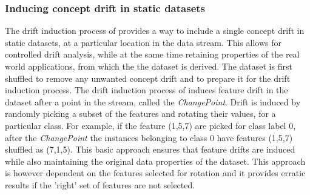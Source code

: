 \documentclass[authoryear,3p,times,twocolumn]{elsarticle}
\begin{document}
\begin{table}[t]
\centering
\caption{Characteristics of datasets chosen for drift induction experiments. }
\label{tbl:induced_data}
\end{table}


\subsubsection{Inducing concept drift in static datasets}
\label{sec:induction}

The drift induction process of \citep{zliobaite2010change} provides a way to include a single concept drift in static datasets, at a particular location in the data stream. This allows for controlled drift analysis, while at the same time retaining properties of the real world applications, from which the the dataset is derived. The dataset is first shuffled to remove any unwanted concept drift and to  prepare it for the drift induction process. The drift induction process of \citep{zliobaite2010change} induces feature drift in the dataset after a point in the stream, called the \textit{ChangePoint}. Drift is induced by randomly picking a subset of the features and rotating their values, for a particular class. For example, if the feature (1,5,7) are picked for class label 0, after the \textit{ChangePoint} the instances belonging to class 0 have features (1,5,7) shuffled as (7,1,5). This basic approach ensures that feature drifts are induced while also maintaining the original data properties of the dataset. This approach is however dependent on the features selected for rotation and it provides erratic results if the 'right' set of features are not selected. 
\end{document}
